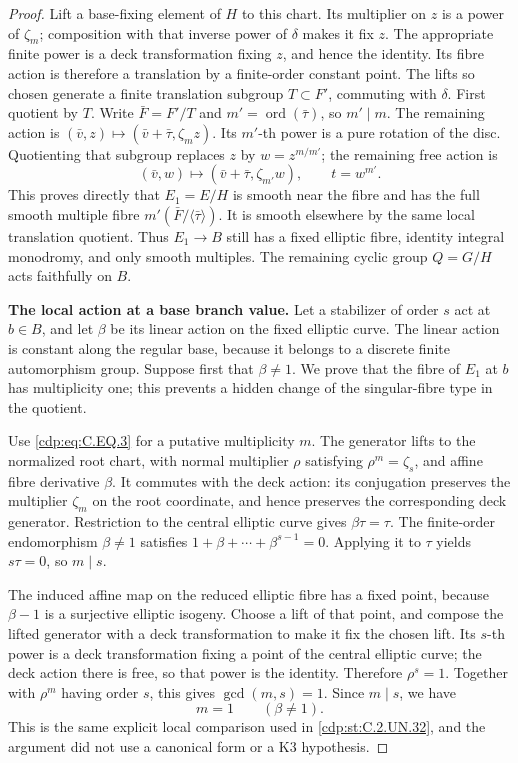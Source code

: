 \begin{proof}
Lift a base-fixing element of $H$ to this chart.
Its multiplier on $z$ is a power of $\zeta_m$;
composition with that inverse power of $\delta$
makes it fix $z$. The appropriate finite power
is a deck transformation fixing $z$, and hence
the identity. Its fibre action is therefore a
translation by a finite-order constant point.
The lifts so chosen generate a finite translation
subgroup $T\subset F'$, commuting with $\delta$.
First quotient by $T$. Write $\bar F=F'/T$ and
$m'=\operatorname{ord}(\bar\tau)$, so $m'\mid m$.
The remaining action is
$(\bar v,z)\mapsto(\bar v+\bar\tau,\zeta_m z)$.
Its $m'$-th power is a pure rotation of the disc.
Quotienting that subgroup replaces $z$ by
$w=z^{m/m'}$; the remaining free action is
\[
 (\bar v,w)\longmapsto(\bar v+\bar\tau,\zeta_{m'}w),
 \qquad t=w^{m'}.                                    \tag{C.EQ.4}\label{cdp:eq:C.EQ.4}
\]
This proves directly that $E_1=E/H$ is smooth near
the fibre and has the full smooth multiple fibre
$m'(\bar F/\langle\bar\tau\rangle)$. It is smooth
elsewhere by the same local translation quotient.
Thus $E_1\to B$ still has a fixed elliptic fibre,
identity integral monodromy, and only smooth multiples.
The remaining cyclic group $Q=G/H$ acts faithfully
on $B$.

\par\medskip\noindent\textbf{The local action at a base branch value.}
Let a stabilizer of order $s$ act at $b\in B$, and
let $\beta$ be its linear action on the fixed elliptic
curve. The linear action is constant along the regular
base, because it belongs to a discrete finite automorphism
group. Suppose first that $\beta\ne1$.
We prove that the fibre of $E_1$ at $b$ has multiplicity
one; this prevents a hidden change of the singular-fibre
type in the quotient.

Use \eqref{cdp:eq:C.EQ.3} for a putative multiplicity $m$.
The generator lifts to the normalized root chart,
with normal multiplier $\rho$ satisfying
$\rho^m=\zeta_s$, and affine fibre derivative $\beta$.
It commutes with the deck action: its conjugation
preserves the multiplier $\zeta_m$ on the root
coordinate, and hence preserves the corresponding
deck generator. Restriction to the central elliptic
curve gives $\beta\tau=\tau$. The finite-order
endomorphism $\beta\ne1$ satisfies
$1+\beta+\cdots+\beta^{s-1}=0$. Applying it to
$\tau$ yields $s\tau=0$, so $m\mid s$.

The induced affine map on the reduced elliptic
fibre has a fixed point, because $\beta-1$ is a
surjective elliptic isogeny. Choose a lift of that
point, and compose the lifted generator with a
deck transformation to make it fix the chosen
lift. Its $s$-th power is a deck transformation
fixing a point of the central elliptic curve;
the deck action there is free, so that power is
the identity. Therefore $\rho^s=1$.
Together with $\rho^m$ having order $s$, this
gives $\gcd(m,s)=1$. Since $m\mid s$, we have
\[
                 m=1\qquad(\beta\ne1).               \tag{C.EQ.5}\label{cdp:eq:C.EQ.5}
\]
This is the same explicit local comparison used
in \ref{cdp:st:C.2.UN.32}, and the argument did not use a canonical
form or a K3 hypothesis.


\end{proof}
